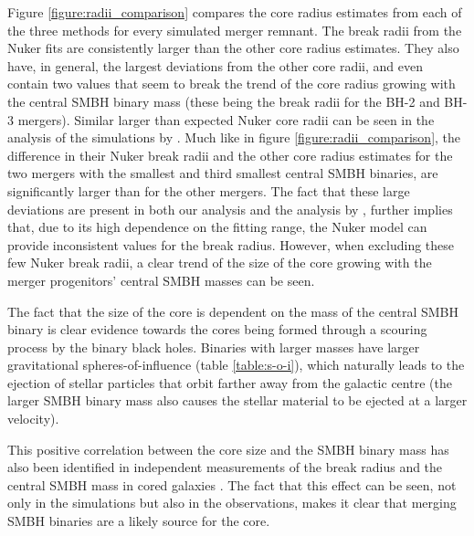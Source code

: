 \documentclass[english, oneside]{HYgradu}
\begin{document}
Figure \ref{figure:radii_comparison} compares the core radius estimates from each of the three methods for every simulated merger remnant. The break radii from the Nuker fits are consistently larger than the other core radius estimates. They also have, in general, the largest deviations from the other core radii, and even contain two values that seem to break the trend of the core radius growing with the central SMBH binary mass (these being the break radii for the BH-2 and BH-3 mergers). Similar larger than expected Nuker core radii can be seen in the analysis of the simulations by \cite{Rantala2018}. Much like in figure \ref{figure:radii_comparison}, the difference in their Nuker break radii and the other core radius estimates for the two mergers with the smallest and third smallest central SMBH binaries, are significantly larger than for the other mergers. The fact that these large deviations are present in both our analysis and the analysis by \cite{Rantala2018}, further implies that, due to its high dependence on the fitting range, the Nuker model can provide inconsistent values for the break radius. However, when excluding these few Nuker break radii, a clear trend of the size of the core growing with the merger progenitors' central SMBH masses can be seen.

The fact that the size of the core is dependent on the mass of the central SMBH binary is clear evidence towards the cores being formed through a scouring process by the binary black holes. Binaries with larger masses have larger gravitational spheres-of-influence (table \ref{table:s-o-i}), which naturally leads to the ejection of stellar particles that orbit farther away from the galactic centre (the larger SMBH binary mass also causes the stellar material to be ejected at a larger velocity). 

This positive correlation between the core size and the SMBH binary mass has also been identified in independent measurements of the break radius and the central SMBH mass in cored galaxies \citep[e.g.][]{deRuiter2005, Lauer2007Cusp, Thomas2016}. The fact that this effect can be seen, not only in the simulations but also in the observations, makes it clear that merging SMBH binaries are a likely source for the core.
\end{document}
